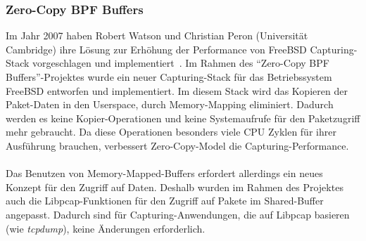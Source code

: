 \subsubsection*{Zero-Copy BPF Buffers}\label{sec:verw_bpf}
Im Jahr 2007 haben Robert Watson und Christian Peron (Universität Cambridge)
ihre Lösung zur Erhöhung  der Performance von FreeBSD Capturing-Stack
vorgeschlagen und implementiert~\cite{zerocopy}.  Im Rahmen des ``Zero-Copy BPF
Buffers''-Projektes wurde ein neuer Capturing-Stack für das Betriebssystem
FreeBSD entworfen und implementiert.  Im diesem Stack wird das Kopieren der
Paket-Daten in den Userspace, durch Memory-Mapping eliminiert. Dadurch  werden
es keine Kopier-Operationen und keine Systemaufrufe für den Paketzugriff mehr
gebraucht. Da diese Operationen besonders viele CPU Zyklen für ihrer Ausführung
brauchen, verbessert Zero-Copy-Model die Capturing-Performance.\\\\
%
Das Benutzen von Memory-Mapped-Buffers erfordert allerdings ein neues
Konzept für den Zugriff auf Daten. Deshalb wurden im Rahmen des Projektes auch
die Libpcap-Funktionen für den Zugriff auf Pakete im Shared-Buffer angepasst.
Dadurch sind für Capturing-Anwendungen, die auf Libpcap basieren (wie
\emph{tcpdump}), keine Änderungen erforderlich.


